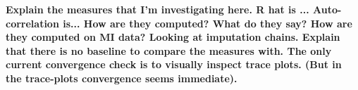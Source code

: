 \documentclass[article]{jss}
\begin{document}

\textbf{Explain the measures that I'm investigating here. R hat is ... Auto-correlation is... How are they computed? What do they say? How are they computed on MI data? Looking at imputation chains. 
Explain that there is no baseline to compare the measures with. The only current convergence check is to visually inspect trace plots. (But in the trace-plots convergence seems immediate).}
\end{document}
